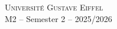 \documentclass[11pt,a4paper]{article}
\begin{document}
\begin{center}
  \textsc{Universit\'e Gustave Eiffel} \hfill  \,\\
  M2 -- Semester 2 -- 2025/2026 \hfill \,
\end{center}




\end{document}
